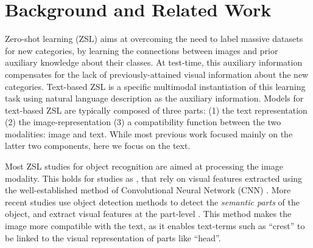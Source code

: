 \documentclass[11pt,a4paper]{article}
\newcommand\yuval[1]{\textcolor{darkpink}{\textbf{YUVAL:} #1 }}
\newcommand\tzuf[1]{\textcolor{blue}{\textbf{TZUF:} #1 }}
\newcommand\reut[1]{\textcolor{green}{\textbf{REUT:} #1 }}
\begin{document}
\section{Background and Related Work}
Zero-shot learning (ZSL) %
aims at overcoming the need to label massive datasets for new categories, by learning the connections between images and prior auxiliary knowledge about their classes. At test-time, this auxiliary information compensates for the lack of previously-attained visual information about  the new categories.
Text-based ZSL is a specific multimodal instantiation of this learning task using natural language description as the auxiliary information. Models for text-based ZSL are typically composed of three parts: (1) the text representation (2) the image-representation (3) a compatibility function between the two modalities: image and text.   While most previous work focused mainly on the latter two components, here we %
focus on the text.  

Most ZSL  studies   for object recognition are aimed at processing  the image modality. This holds for studies as \citet{xu2018attngan,lei2015predicting,qiao2016less,akata2016multi}, that rely on visual features  extracted using the well-established method of
Convolutional Neural Network (CNN) \cite{lecun1995convolutional}. More recent studies use object detection methods to detect the {\em semantic parts} of the object, and extract visual features at the part-level \cite{elhoseiny2017link,zhu2018generative,zhang2016spda}. This
method makes the image more compatible with the text, as it enables text-terms such as \enquote{crest} to be linked to the visual representation of parts like \enquote{head}. 
\end{document}
